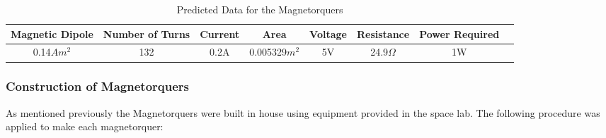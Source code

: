 \begin{table}[H]
    \begin{center}
        \caption{Predicted Data for the Magnetorquers}
        \begin{tabular}{|c|c|c|c|c|c|c|c|}
            \hline
            Magnetic Dipole & Number of Turns & Current & Area & Voltage & Resistance & Power Required\\
            \hline
            0.14$Am^2$ & 132 & 0.2A & 0.005329$m^2$ & 5V & 24.9$\Omega$ & 1W\\
            \hline
        \end{tabular}
    \end{center}
    \vspace{-6mm}
\end{table}
\subsubsection{Construction of Magnetorquers}
As mentioned previously the Magnetorquers were built in house using equipment provided in the space lab.  The following procedure was applied to make each magnetorquer:
